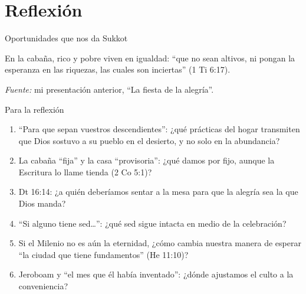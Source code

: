 \documentclass[hyperref={bookmarks=false},aspectratio=169]{beamer}
\newcommand{\SENOR}{S{\fontsize{0.78em}{1em}\selectfont EÑOR}}
\begin{document}
\section{Reflexión}

\begin{frame}{Oportunidades que nos da Sukkot}
\centering
{}\par\medskip
\scriptsize En la cabaña, rico y pobre viven en igualdad: ``que no sean altivos, ni pongan la esperanza en las riquezas, las cuales son inciertas'' (1 Ti 6:17).\par\smallskip
{\fontsize{6}{7}\selectfont\color{sepia}\textit{Fuente:} mi presentación anterior, ``La fiesta de la alegría''.}
\end{frame}

\begin{frame}{Para la reflexión}
\small
\begin{enumerate}
\item ``Para que sepan vuestros descendientes'': ¿qué prácticas del hogar transmiten que Dios sostuvo a su pueblo en el desierto, y no solo en la abundancia?
\item La cabaña ``fija'' y la casa ``provisoria'': ¿qué damos por fijo, aunque la Escritura lo llame tienda (2 Co 5:1)?
\item Dt 16:14: ¿a quién deberíamos sentar a la mesa para que la alegría sea la que Dios manda?
\item ``Si alguno tiene sed\ldots'': ¿qué sed sigue intacta en medio de la celebración?
\item Si el Milenio no es aún la eternidad, ¿cómo cambia nuestra manera de esperar ``la ciudad que tiene fundamentos'' (He 11:10)?
\item Jeroboam y ``el mes que él había inventado'': ¿dónde ajustamos el culto a la conveniencia?
\end{enumerate}
\end{frame}
\end{document}
